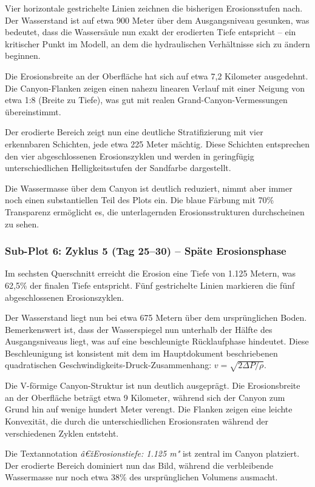 Vier horizontale gestrichelte Linien zeichnen die bisherigen Erosionsstufen nach. Der Wasserstand ist auf etwa 900 Meter über dem Ausgangsniveau gesunken, was bedeutet, dass die Wassersäule nun exakt der erodierten Tiefe entspricht -- ein kritischer Punkt im Modell, an dem die hydraulischen Verhältnisse sich zu ändern beginnen.

Die Erosionsbreite an der Oberfläche hat sich auf etwa 7,2 Kilometer ausgedehnt. Die Canyon-Flanken zeigen einen nahezu linearen Verlauf mit einer Neigung von etwa 1:8 (Breite zu Tiefe), was gut mit realen Grand-Canyon-Vermessungen übereinstimmt.

Der erodierte Bereich zeigt nun eine deutliche Stratifizierung mit vier erkennbaren Schichten, jede etwa 225 Meter mächtig. Diese Schichten entsprechen den vier abgeschlossenen Erosionszyklen und werden in geringfügig unterschiedlichen Helligkeitsstufen der Sandfarbe dargestellt.

Die Wassermasse über dem Canyon ist deutlich reduziert, nimmt aber immer noch einen substantiellen Teil des Plots ein. Die blaue Färbung mit 70\% Transparenz ermöglicht es, die unterlagernden Erosionsstrukturen durchscheinen zu sehen.

\subsubsection*{Sub-Plot 6: Zyklus 5 (Tag 25--30) -- Späte Erosionsphase}

Im sechsten Querschnitt erreicht die Erosion eine Tiefe von 1.125 Metern, was 62,5\% der finalen Tiefe entspricht. Fünf gestrichelte Linien markieren die fünf abgeschlossenen Erosionszyklen.

Der Wasserstand liegt nun bei etwa 675 Metern über dem ursprünglichen Boden. Bemerkenswert ist, dass der Wasserspiegel nun unterhalb der Hälfte des Ausgangsniveaus liegt, was auf eine beschleunigte Rücklaufphase hindeutet. Diese Beschleunigung ist konsistent mit dem im Hauptdokument beschriebenen quadratischen Geschwindigkeits-Druck-Zusammenhang: $v = \sqrt{2\Delta P / \rho}$.

Die V-förmige Canyon-Struktur ist nun deutlich ausgeprägt. Die Erosionsbreite an der Oberfläche beträgt etwa 9 Kilometer, während sich der Canyon zum Grund hin auf wenige hundert Meter verengt. Die Flanken zeigen eine leichte Konvexität, die durch die unterschiedlichen Erosionsraten während der verschiedenen Zyklen entsteht.

Die Textannotation \textit{â€žErosionstiefe: 1.125 m"} ist zentral im Canyon platziert. Der erodierte Bereich dominiert nun das Bild, während die verbleibende Wassermasse nur noch etwa 38\% des ursprünglichen Volumens ausmacht.

